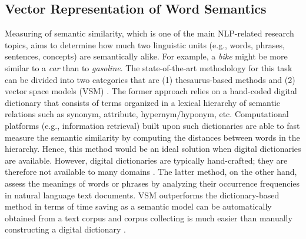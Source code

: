 \documentclass[Journal,InsideFigs, DoubleSpace]{ascelike} %
\begin{document}
\subsection{Vector Representation of Word Semantics}
Measuring of semantic similarity, which is one of the main NLP-related research topics, aims to determine how much two linguistic units (e.g., words, phrases, sentences, concepts) are semantically alike. For example, a \textit{bike} might be more similar to a \textit{car} than to \textit{gasoline}. The state-of-the-art methodology for this task can be divided into two categories that are (1) thesaurus-based methods and (2) vector space models (VSM) \cite{harispe13}. The former approach relies on a hand-coded digital dictionary that consists of terms organized in a lexical hierarchy of semantic relations such as synonym, attribute, hypernym/hyponym, etc. Computational platforms (e.g., information retrieval) built upon such dictionaries are able to fast measure the semantic similarity by computing the distances between words in the hierarchy. Hence, this method would be an ideal solution when digital dictionaries are available. However, digital dictionaries are typically hand-crafted; they are therefore not available to many domains \cite{kolb08}. The latter method, on the other hand, assess the meanings of words or phrases by analyzing their occurrence frequencies in natural language text documents. VSM outperforms the dictionary-based method in terms of time saving as a semantic model can be automatically obtained from a text corpus and corpus collecting is much easier than manually constructing a digital dictionary \cite{turney10}.
\par
\end{document}
